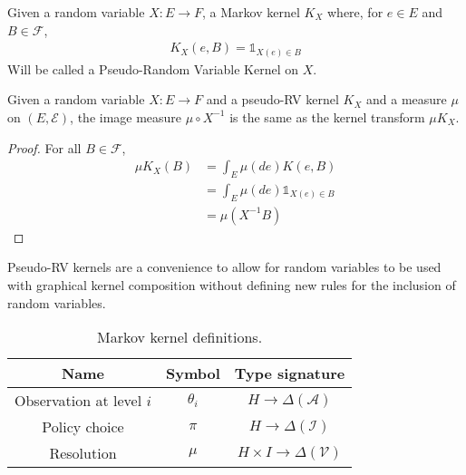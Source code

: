\begin{definition}
    Given a random variable $X:E\to F$, a Markov kernel $K_X$ where, for $e\in E$ and $B\in\mathcal{F}$,
    \begin{align}
        K_X(e,B) = \mathds{1}_{X(e)\in B}
    \end{align}
    Will be called a Pseudo-Random Variable Kernel on $X$.
\end{definition}

\begin{lemma}
Given a random variable $X:E\to F$ and a pseudo-RV kernel $K_X$ and a measure $\mu$ on $(E,\mathcal{E})$, the image measure $\mu\circ X^{-1}$ is the same as the kernel transform $\mu K_X$.
\end{lemma}

\begin{proof}
For all $B\in\mathcal{F}$,
\begin{align}
    \mu K_X(B) &= \int_E \mu(de)K(e,B) \\
               &= \int_E \mu(de) \mathds{1}_{X(e)\in B} \\
               &= \mu(X^{-1} B)
\end{align}
\end{proof}

Pseudo-RV kernels are a convenience to allow for random variables to be used with graphical kernel composition without defining new rules for the inclusion of random variables.

\begin{table}[h]
    \centering
    \begin{tabular}{c|c|c}
        Name & Symbol & Type signature  \\
        \hline
        Observation at level $i$ & $\theta_i$ & $H\to \Delta(\mathcal{A})$ \\
        Policy choice & $\pi$ & $H\to \Delta(\mathcal{I})$ \\
        Resolution & $\mu$ & $H\times I \to \Delta(\mathcal{V})$  \\
    \end{tabular}
    \caption{Markov kernel definitions.}
    \label{tab:kernels}
\end{table}


